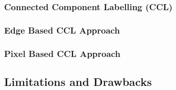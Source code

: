 \documentclass[12pt]{article}
\begin{document}
    \subsubsection{Connected Component Labelling (CCL)}\label{subsubsec:connected-component-labelling-(ccl)}



    \subsubsection{Edge Based CCL Approach}\label{subsubsec:edge-based-ccl-approach}



    \subsubsection{Pixel Based CCL Approach}\label{subsubsec:pixel-based-ccl-approach}



    \subsection{Limitations and Drawbacks}\label{subsec:limitations-and-drawbacks}

\end{document}
